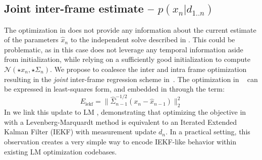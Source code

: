 \subsection{Joint inter-frame estimate -- $p(x_n|d_{1..n})$}
\label{sec:joint}
The optimization in  does not provide any information about the current estimate of the parameters $\hat{x}_n$ to the independent solve described in . This could be problematic, as in this case  does not leverage any temporal information aside from initialization, while relying on a sufficiently good initialization to compute $\mathcal{N}(\star{x}_n, \star{\Sigma}_n)$. 
%
% 
% 
%
We propose to coalesce the inter and intra frame optimization resulting in the \emph{joint} inter-frame regression scheme in~. 
The optimization in ~ can be expressed in least-squares form, and embedded in  through the term:
% 
\begin{equation}
E_\text{iekf} = \| \hat{\Sigma}^{-1/2}_{n - 1}(x_n - \hat{x}_{n - 1})\|_2^2 
\label{eq:iekflm}   
\end{equation}
%
In  we link this update to LM \cite{Skoglund15}, demonstrating that optimizing the objective in~ with a Levenberg-Marquardt method is equivalent to an Iterated Extended Kalman Filter (IEKF) with measurement update $d_n$.   In a practical setting, this observation creates a very simple way to encode IEKF-like behavior within existing LM optimization codebases.  



